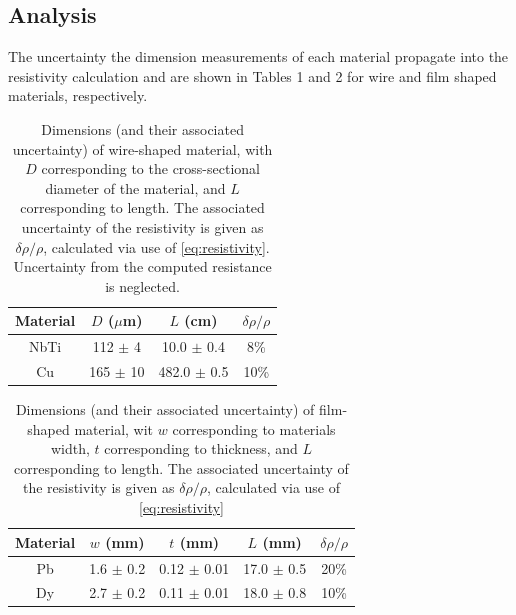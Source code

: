 \documentclass[prl,twocolumn,superscriptaddress,floatfix]{revtex4}
\begin{document}
\subsection{Analysis}
The uncertainty the dimension measurements of each material propagate into the resistivity calculation and are shown in Tables 1 and 2 for wire and film shaped materials, respectively.
\begin{table}[H]
    \begin{center}
    \begin{tabular}{|c|c|c|c|}
    \hline
    Material & $D$ ($\mu$m) & $L$ (cm) & $\delta \rho / \rho$ \\ 
    \hline
    NbTi & 112 $\pm$ 4 & 10.0 $\pm$ 0.4 & 8\% \\
    \hline
    Cu & 165 $\pm$ 10 & 482.0 $\pm$ 0.5 & 10\% \\
    \hline
    \end{tabular}
    \caption{Dimensions (and their associated uncertainty) of wire-shaped material, with $D$ corresponding to the cross-sectional diameter of the material, and $L$ corresponding to length. The associated uncertainty of the resistivity is given as $\delta \rho / \rho$, calculated via use of \eqref{eq:resistivity}. Uncertainty from the computed resistance is neglected.}
    \label{tab:dimension_wire}
    \end{center}
\end{table}


\begin{table}[H]
    \begin{center}
    \begin{tabular}{|c|c|c|c|c|}
    \hline
    Material & $w$ (mm) & $t$ (mm) & $L$ (mm) & $\delta \rho / \rho$ \\ 
       \hline
    Pb & 1.6 $\pm$ 0.2 & 0.12 $\pm$ 0.01 & 17.0 $\pm$ 0.5 & 20\% \\
       \hline
    Dy & 2.7 $\pm$ 0.2 & 0.11 $\pm$ 0.01 & 18.0 $\pm$ 0.8 & 10\% \\
    \hline
    \end{tabular}
    \caption{Dimensions (and their associated uncertainty) of film-shaped material, wit $w$ corresponding to materials width, $t$ corresponding to thickness, and $L$ corresponding to length. The associated uncertainty of the resistivity is given as $\delta \rho / \rho$, calculated via use of \eqref{eq:resistivity}}
    \label{tab:dimension_film}
    \end{center}
\end{table}
\end{document}
